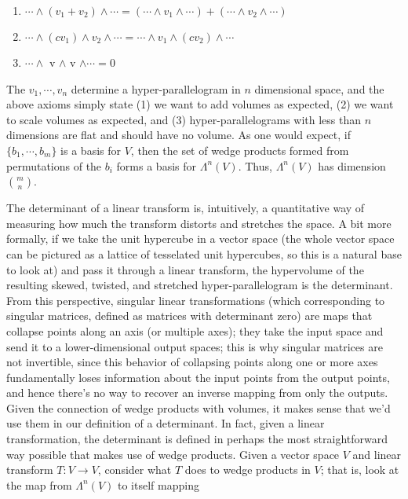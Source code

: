 \documentclass{article}
\newcommand{\n}{\leavevmode \newline}
\newcommand{\nn}{\leavevmode \newline \newline}
\begin{document}
\begin{adjustwidth}{1cm}{1cm}
    \begin{enumerate}
	    \item $ \cdots \wedge (v_1 + v_2) \wedge \cdots = (\cdots \wedge v_1 \wedge \cdots) + (\cdots \wedge v_2 \wedge \cdots) $
	    \item $ \cdots \wedge (c v_1) \wedge v_2 \wedge \cdots = \cdots \wedge v_1 \wedge (c v_2) \wedge \cdots $
	    \item $ \cdots \wedge $ v $ \wedge $ v $ \wedge \cdots = 0 $
    \end{enumerate}

    The $ v_1, \cdots, v_n $ determine a hyper-parallelogram in $ n $ dimensional space, and the above axioms simply state (1) we want to add volumes as expected, (2) we want to scale volumes as expected, and (3) hyper-parallelograms with less than $ n $ dimensions are flat and should have no volume. As one would expect, if $ \{ b_1, \cdots, b_m \} $ is a basis for $ V $, then the set of wedge products formed from permutations of the $ b_i $ forms a basis for $ \Lambda^n(V) $. Thus, $ \Lambda^n(V) $ has dimension $ {{m}\choose{n}} $.

\end{adjustwidth}
\n
The determinant of a linear transform is, intuitively, a quantitative way of measuring how much the transform distorts and stretches the space. A bit more formally, if we take the unit hypercube in a vector space (the whole vector space can be pictured as a lattice of tesselated unit hypercubes, so this is a natural base to look at) and pass it through a linear transform, the hypervolume of the resulting skewed, twisted, and stretched hyper-parallelogram is the determinant. From this perspective, singular linear transformations (which corresponding to singular matrices, defined as matrices with determinant zero) are maps that collapse points along an axis (or multiple axes); they take the input space and send it to a lower-dimensional output spaces; this is why singular matrices are not invertible, since this behavior of collapsing points along one or more axes fundamentally loses information about the input points from the output points, and hence there's no way to recover an inverse mapping from only the outputs. Given the connection of wedge products with volumes, it makes sense that we'd use them in our definition of a determinant. In fact, given a linear transformation, the determinant is defined in perhaps the most straightforward way possible that makes use of wedge products.
\nn
Given a vector space $ V $ and linear transform $ T: V \rightarrow V $, consider what $ T $ does to wedge products in $ V $; that is, look at the map from $ \Lambda^n(V) $ to itself mapping
\end{document}
